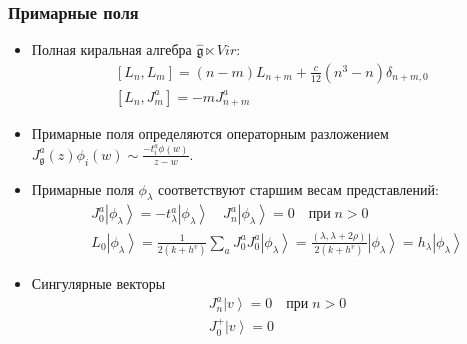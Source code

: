 \documentclass[pdftex]{beamer}
\newcommand{\gf}{\mathfrak{g}}
\newcommand{\gfh}{\hat{\mathfrak{g}}}
\theoremstyle{definition} \newtheorem{Def}{Определение}
\begin{document}
\begin{frame}
  \frametitle{Примарные поля}
  \begin{itemize}
  \item Полная киральная алгебра $\gfh \ltimes Vir$:
    \begin{equation}
      \label{eq:92}
      \begin{aligned}
        \left[L_n,L_m\right]=(n-m)L_{n+m}+\frac{c}{12}(n^3-n)\delta_{n+m,0}\\
        \left[L_n,J^a_m\right]=-mJ^a_{n+m}
      \end{aligned}
    \end{equation}
  \item Примарные поля определяются операторным разложением $J_{\gf}^{a}(z)\phi_{i}(w)\sim \frac{-t^{a}_{i}\phi(w)}{z-w}$.
  \item Примарные поля $\phi_{\lambda}$ соответствуют старшим весам представлений:
    \begin{equation*}
      \begin{aligned}
        & J_0^a\left|\phi_{\lambda}\right>=-t^a_{\lambda}\left|\phi_{\lambda}\right>  \quad    J^a_n\left|\phi_{\lambda}\right>=0 \quad \mbox{при}\; n>0 \\
        & L_0\left|\phi_{\lambda}\right>=\frac{1}{2(k+h^v)}\sum_aJ^a_0J^a_0\left|\phi_{\lambda}\right>=\frac{(\lambda,\lambda+2\rho)}{2(k+h^v)}\left|\phi_{\lambda}\right>=h_{\lambda} \left|\phi_{\lambda}\right>
      \end{aligned}
    \end{equation*}
  \item Сингулярные векторы 
    \begin{equation*}
    \begin{aligned}
      &J^a_n\left|v \right>=0 \quad \mbox{при}\; n>0 \\
      & J^{+}_{0} \left|v \right>=0
    \end{aligned}
    \end{equation*}
  \end{itemize}
\end{frame}
\end{document}
